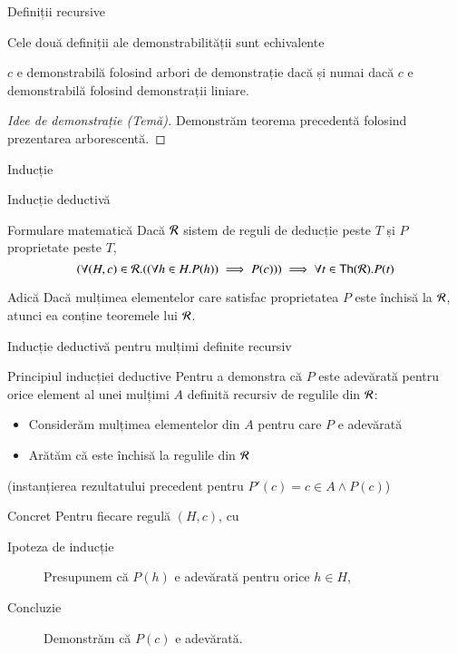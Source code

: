 \documentclass[xcolor=pdftex,romanian,colorlinks]{beamer}
\begin{document}
\begin{section}{Definiții recursive}
\begin{frame}{Cele două definiții ale demonstrabilității sunt echivalente}
\begin{theorem}
$c$ e demonstrabilă folosind arbori de demonstrație dacă și numai dacă $c$ e demonstrabilă folosind demonstrații liniare. 
\end{theorem}
\begin{proof}[Idee de demonstrație (Temă)]
Demonstrăm teorema precedentă folosind prezentarea arborescentă.
\end{proof}
\end{frame}




\end{section}


\begin{section}{Inducție}
\begin{frame}{Inducție deductivă}

\begin{block}{Formulare matematică}
Dacă $\cal R$ sistem de reguli de deducție peste $T$ și $P$ proprietate peste $T$,
\[(\forall (H,c)\in {\cal R}.((\forall h\in H.P(h))\implies P(c)))\implies \forall t\in{\sf Th}({\cal R}).P(t)\]
\end{block}


\begin{block}{Adică}
  Dacă mulțimea elementelor care satisfac proprietatea $P$ este închisă la ${\cal R}$, atunci ea conține teoremele lui ${\cal R}$. 
\end{block}
\end{frame}

\begin{frame}{Inducție deductivă pentru mulțimi definite recursiv}

\begin{block}{Principiul inducției deductive}
Pentru a demonstra că $P$ este adevărată pentru orice element al unei mulțimi $A$ definită recursiv de regulile din $\cal R$:
\begin{itemize}
  \item Considerăm mulțimea elementelor din $A$ pentru care $P$ e adevărată
  \item Arătăm că este închisă la regulile din $\cal R$
\end{itemize}
(instanțierea rezultatului precedent pentru $P'(c) = c \in A  \wedge P(c)$)
\end{block}

\begin{block}{Concret}
Pentru fiecare regulă $(H,c)$, cu 
\begin{description} 
\item[Ipoteza de inducție] Presupunem că $P(h)$ e adevărată pentru orice $h\in H$,
\item[Concluzie] Demonstrăm că $P(c)$ e adevărată.
\end{description}	
\end{block}
\end{frame}



\end{section}
\end{document}

